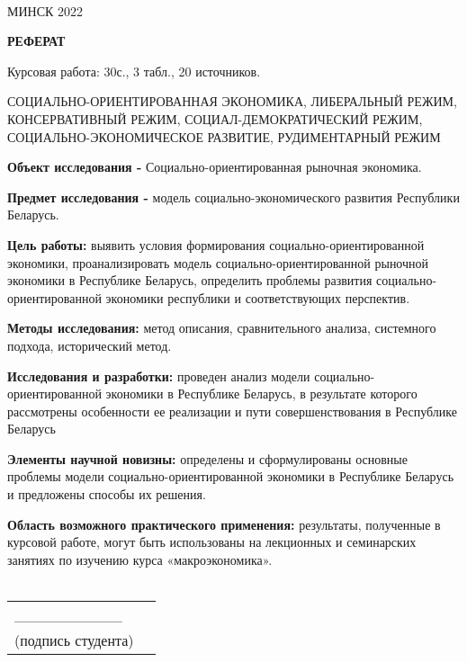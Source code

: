 \documentclass[14pt,a4paper]{article}
\begin{document}
\begin{titlepage}
        \HRule\\[5.5cm]
        {\large МИНСК 2022}
        \vfill
    \end{titlepage}

    \newpage
    \begin{center}
        \textbf{\Large{РЕФЕРАТ}}
    \end{center}
    \par
    Курсовая работа: 30с., 3 табл., 20 источников.
    \\
    \par
    \large{СОЦИАЛЬНО-ОРИЕНТИРОВАННАЯ ЭКОНОМИКА, ЛИБЕРАЛЬНЫЙ РЕЖИМ, КОНСЕРВАТИВНЫЙ РЕЖИМ, СОЦИАЛ-ДЕМОКРАТИЧЕСКИЙ РЕЖИМ,}
    \\
    \large{СОЦИАЛЬНО-ЭКОНОМИЧЕСКОЕ РАЗВИТИЕ, РУДИМЕНТАРНЫЙ РЕЖИМ}
    \\
    \par
    \textbf{Объект исследования - } Социально-ориентированная рыночная экономика.
    \par
    \textbf{Предмет исследования - } модель социально-экономического развития Республики Беларусь.
    \par
    \textbf{Цель работы:} выявить условия формирования социально-ориентированной экономики, проанализировать модель социально-ориентированной рыночной экономики в Республике Беларусь, определить проблемы развития социально-ориентированной экономики республики и соответствующих перспектив.
    \par
    \textbf{Методы исследования:} метод описания, сравнительного анализа, системного подхода, исторический метод.
    \par
    \textbf{Исследования и разработки:} проведен анализ модели социально-ориентированной экономики в Республике Беларусь, в результате которого рассмотрены особенности ее реализации и пути совершенствования в Республике Беларусь
    \par
    \textbf{Элементы научной новизны:} определены и сформулированы основные проблемы модели социально-ориентированной экономики в Республике Беларусь и предложены способы их решения.
    \par
    \textbf{Область возможного практического применения:} результаты, полученные в курсовой работе, могут быть использованы на лекционных и семинарских занятиях по изучению курса «макроэкономика».
    \\
    \\
    \hfill\begin{tabular}{lp{.5\linewidth}@{}}
              \_\_\_\_\_\_\_\_\_\_
              \\
              (подпись студента) \\
    \end{tabular}
\end{document}
